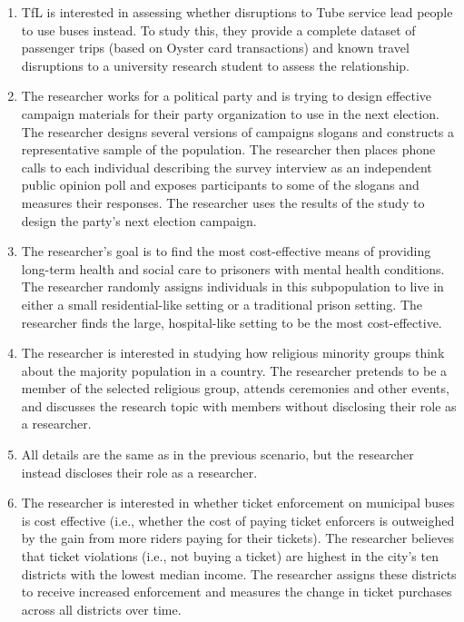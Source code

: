 \documentclass[12pt,a4]{article}
\begin{document}
\begin{enumerate}
\item TfL is interested in assessing whether disruptions to Tube service lead people to use buses instead. To study this, they provide a complete dataset of passenger trips (based on Oyster card transactions) and known travel disruptions to a university research student to assess the relationship.

\item The researcher works for a political party and is trying to design effective campaign materials for their party organization to use in the next election. The researcher designs several versions of campaigns slogans and constructs a representative sample of the population. The researcher then places phone calls to each individual describing the survey interview as an independent public opinion poll and exposes participants to some of the slogans and measures their responses. The researcher uses the results of the study to design the party's next election campaign. %

\item The researcher's goal is to find the most cost-effective means of providing long-term health and social care to prisoners with mental health conditions. The researcher randomly assigns individuals in this subpopulation to live in either a small residential-like setting or a traditional prison setting. The researcher finds the large, hospital-like setting to be the most cost-effective. %

\item The researcher is interested in studying how religious minority groups think about the majority population in a country. The researcher pretends to be a member of the selected religious group, attends ceremonies and other events, and discusses the research topic with members without disclosing their role as a researcher.

\item All details are the same as in the previous scenario, but the researcher instead discloses their role as a researcher.

\item The researcher is interested in whether ticket enforcement on municipal buses is cost effective (i.e., whether the cost of paying ticket enforcers is outweighed by the gain from more riders paying for their tickets). The researcher believes that ticket violations (i.e., not buying a ticket) are highest in the city's ten districts with the lowest median income. The researcher assigns these districts to receive increased enforcement and measures the change in ticket purchases across all districts over time. %


\end{enumerate}
\end{document}
